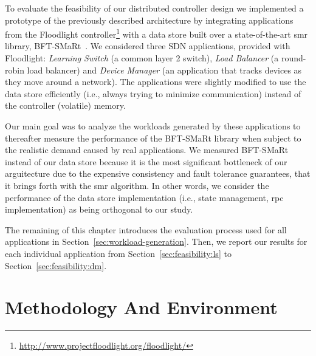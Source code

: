 \label{sec:feasibility:apps}
\glsresetall

To evaluate the feasibility of our distributed controller design we implemented a prototype of the previously described architecture by integrating applications from the Floodlight controller\footnote{\url{http://www.projectfloodlight.org/floodlight/}} with a data store built over a state-of-the-art \gls{smr} library, BFT-SMaRt~\cite{smart-tr}. 
We considered three SDN applications, provided with Floodlight: \emph{Learning Switch}  (a common layer 2 switch), \emph{Load   Balancer} (a round-robin load balancer) and \emph{Device Manager} (an application that tracks devices as they move around a network). 
The applications were slightly modified to use the data store efficiently (i.e., always trying to minimize communication) instead of the controller (volatile) memory.

Our main goal  was to analyze the workloads generated by these applications to thereafter measure the performance of the BFT-SMaRt library when subject to the realistic demand caused by real applications.
We measured BFT-SMaRt instead of our data store because it is the most significant bottleneck of our arguitecture due to the expensive consistency and fault tolerance guarantees, that it  brings forth with the \gls{smr} algorithm. 
In other words, we consider the performance of the data store implementation (i.e., state management, \gls{rpc} implementation) as being orthogonal to our study. 

The remaining of this chapter introduces the evaluation process used for all applications in Section~\ref{sec:workload-generation}. 
Then, we report our results for each individual application from  Section~\ref{sec:feasibility:ls} to Section~\ref{sec:feasibility:dm}. 


\section{Methodology And Environment}


